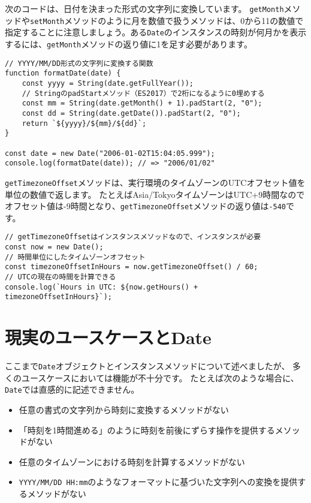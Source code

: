 次のコードは、日付を決まった形式の文字列に変換しています。
\texttt{getMonth}メソッドや\texttt{setMonth}メソッドのように月を数値で扱うメソッドは、0から11の数値で指定することに注意しましょう。ある\texttt{Date}のインスタンスの時刻が何月かを表示するには、\texttt{getMonth}メソッドの返り値に1を足す必要があります。

\begin{lstlisting}
// YYYY/MM/DD形式の文字列に変換する関数
function formatDate(date) {
    const yyyy = String(date.getFullYear());
    // StringのpadStartメソッド（ES2017）で2桁になるように0埋めする
    const mm = String(date.getMonth() + 1).padStart(2, "0");
    const dd = String(date.getDate()).padStart(2, "0");
    return `${yyyy}/${mm}/${dd}`;
}

const date = new Date("2006-01-02T15:04:05.999");
console.log(formatDate(date)); // => "2006/01/02"
\end{lstlisting}

\texttt{getTimezoneOffset}メソッドは、実行環境のタイムゾーンのUTC\textbf{}オフセット値を\textbf{}単位の数値で返します。
たとえばAsia/TokyoタイムゾーンはUTC+9時間なのでオフセット値は-9時間となり、\texttt{getTimezoneOffset}メソッドの返り値は\texttt{-540}です。

\begin{lstlisting}
// getTimezoneOffsetはインスタンスメソッドなので、インスタンスが必要
const now = new Date();
// 時間単位にしたタイムゾーンオフセット
const timezoneOffsetInHours = now.getTimezoneOffset() / 60;
// UTCの現在の時間を計算できる
console.log(`Hours in UTC: ${now.getHours() + timezoneOffsetInHours}`);
\end{lstlisting}

\hypertarget{usecase}{%
\section{現実のユースケースとDate}\label{usecase}}

ここまで\texttt{Date}オブジェクトとインスタンスメソッドについて述べましたが、
多くのユースケースにおいては機能が不十分です。
たとえば次のような場合に、\texttt{Date}では直感的に記述できません。

\begin{itemize}
\item
  任意の書式の文字列から時刻に変換するメソッドがない
\item
  「時刻を1時間進める」のように時刻を前後にずらす操作を提供するメソッドがない
\item
  任意のタイムゾーンにおける時刻を計算するメソッドがない
\item
  \texttt{YYYY/MM/DD HH:mm}のようなフォーマットに基づいた文字列への変換を提供するメソッドがない
\end{itemize}

